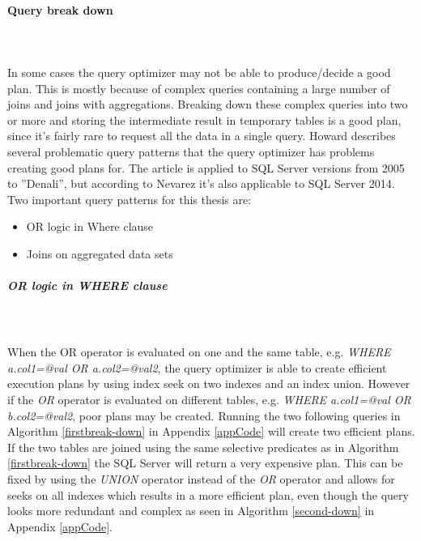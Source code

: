 \documentclass{cslthse-msc}
\begin{document}
\paragraph*{Query break down}\mbox{}\\\\ \label{querybreakdown}
In some cases the query optimizer may not be able to produce/decide a good plan. This is mostly because of complex queries containing a large number of joins and joins with aggregations. Breaking down these complex queries into two or more and storing the intermediate result in temporary tables is a good plan, since it's fairly rare to request all the data in a single query. 
Howard   \cite{break-down} describes several problematic query patterns that the query optimizer has problems creating good plans for. The article is applied to SQL Server versions from 2005 to ''Denali'', but according to Nevarez   \cite{Nevarez} it's also applicable to SQL Server 2014.\\ Two important query patterns for this thesis are:
\begin{itemize}
\item OR logic in Where clause
\item Joins on aggregated data sets
\end{itemize}

\subparagraph{\textit{OR} logic in \textit{WHERE} clause}\mbox{}\\\\
When the OR operator is evaluated on one and the same table, e.g. \textit{WHERE a.col1=@val OR a.col2=@val2}, the query optimizer is able to create efficient execution plans by using index seek on two indexes and an index union. However if the \textit{OR} operator is evaluated on different tables, e.g. \textit{WHERE a.col1=@val OR b.col2=@val2}, poor plans may be created. Running the two following queries in Algorithm \ref{firstbreak-down} in Appendix \ref{appCode} will create two efficient plans.\\

If the two tables are joined using the same selective predicates as in Algorithm \ref{firstbreak-down} the SQL Server will return a very expensive plan. This can be fixed by using the \textit{UNION} operator instead of the \textit{OR} operator and allows for seeks on all indexes which results in a more efficient plan, even though the query looks more redundant and complex as seen in Algorithm \ref{second-down} in Appendix \ref{appCode}.
\end{document}
